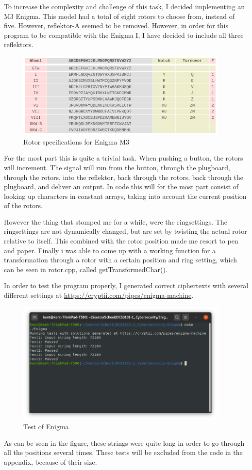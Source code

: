 \documentclass{article}
\begin{document}
To increase the complexity and challenge of this task, I decided implementing an M3 Enigma. This model had a total of eight rotors to choose from, instead of five. However, reflektor-A seemed to be removed. However, in order for this program to be compatible with the Enigma I, I have decided to include all three reflektors. 

\begin{figure}[H]
 \centering
  \includegraphics[width=300pt]{img/enigmaM3specs.png}
 \caption{Rotor specifications for Enigma M3}
 \end{figure}

For the most part this is quite a trivial task. When pushing a button, the rotors will increment. The signal will run from the button, through the plugboard, through the rotors, into the reflektor, back through the rotors, back through the plugboard, and deliver an output. In code this will for the most part consist of looking up characters in constant arrays, taking into account the current position of the rotors. 

However the thing that stomped me for a while, were the ringsettings. The ringsettings are not dynamically changed, but are set by twisting the actual rotor relative to itself. This combined with the rotor position made me resort to pen and paper. Finally i was able to come up with a working function for a transformation through a rotor with a certain position and ring setting, which can be seen in rotor.cpp, called getTransformedChar().

In order to test the program properly, I generated correct ciphertexts with several different settings at \url{https://cryptii.com/pipes/enigma-machine}.
\begin{figure}[H]
 \centering
  \includegraphics[width=300pt]{img/enigmaTest.png}
 \caption{Test of Enigma}
 \end{figure}
As can be seen in the figure, these strings were quite long in order to go through all the positions several times. These tests will be excluded from the code in the appendix, because of their size.
\end{document}

